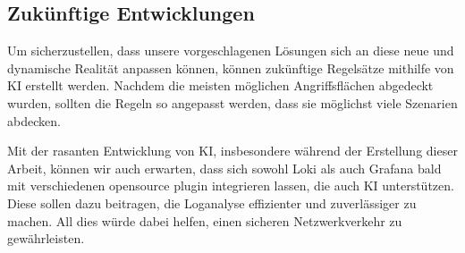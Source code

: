 \subsection{Zukünftige Entwicklungen}
Um sicherzustellen, dass unsere vorgeschlagenen Lösungen sich an diese neue und dynamische Realität anpassen können, können zukünftige Regelsätze mithilfe von \gls{KI} erstellt werden. Nachdem die meisten möglichen Angriffsflächen abgedeckt wurden, sollten die Regeln so angepasst werden, dass sie möglichst viele Szenarien abdecken.


Mit der rasanten Entwicklung von \gls{KI}, insbesondere während der Erstellung dieser Arbeit, können wir auch erwarten, dass sich sowohl Loki als auch Grafana bald mit verschiedenen \gls{opensource} \gls{plugin} integrieren lassen, die auch \gls{KI} unterstützen. Diese sollen dazu beitragen, die Loganalyse effizienter und zuverlässiger zu machen. All dies würde dabei helfen, einen sicheren Netzwerkverkehr zu gewährleisten.


